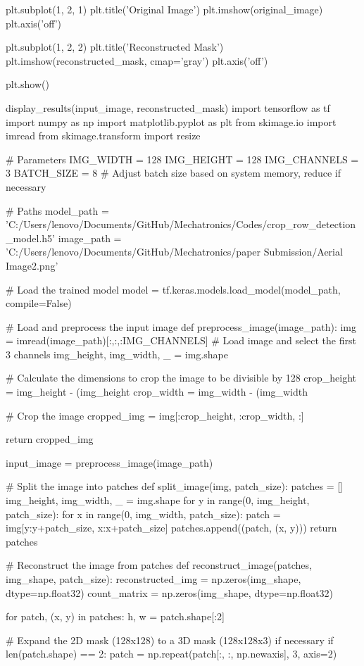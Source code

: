 \documentclass[conference]{IEEEtran}
\begin{document}
plt.subplot(1, 2, 1)
plt.title('Original Image')
plt.imshow(original_image)
plt.axis('off')

plt.subplot(1, 2, 2)
plt.title('Reconstructed Mask')
plt.imshow(reconstructed_mask, cmap='gray')
plt.axis('off')

plt.show()

display_results(input_image, reconstructed_mask)
import tensorflow as tf
import numpy as np
import matplotlib.pyplot as plt
from skimage.io import imread
from skimage.transform import resize

# Parameters
IMG_WIDTH = 128
IMG_HEIGHT = 128
IMG_CHANNELS = 3
BATCH_SIZE = 8  # Adjust batch size based on system memory, reduce if necessary

# Paths
model_path = 'C:/Users/lenovo/Documents/GitHub/Mechatronics/Codes/crop_row_detection_model.h5'
image_path = 'C:/Users/lenovo/Documents/GitHub/Mechatronics/paper Submission/Aerial Image2.png'

# Load the trained model
model = tf.keras.models.load_model(model_path, compile=False)

# Load and preprocess the input image
def preprocess_image(image_path):
img = imread(image_path)[:,:,:IMG_CHANNELS]  # Load image and select the first 3 channels
img_height, img_width, _ = img.shape

# Calculate the dimensions to crop the image to be divisible by 128
crop_height = img_height - (img_height %
crop_width = img_width - (img_width %

# Crop the image
cropped_img = img[:crop_height, :crop_width, :]

return cropped_img

input_image = preprocess_image(image_path)

# Split the image into patches
def split_image(img, patch_size):
patches = []
img_height, img_width, _ = img.shape
for y in range(0, img_height, patch_size):
for x in range(0, img_width, patch_size):
patch = img[y:y+patch_size, x:x+patch_size]
patches.append((patch, (x, y)))
return patches

# Reconstruct the image from patches
def reconstruct_image(patches, img_shape, patch_size):
reconstructed_img = np.zeros(img_shape, dtype=np.float32)
count_matrix = np.zeros(img_shape, dtype=np.float32)

for patch, (x, y) in patches:
h, w = patch.shape[:2]

# Expand the 2D mask (128x128) to a 3D mask (128x128x3) if necessary
if len(patch.shape) == 2:
patch = np.repeat(patch[:, :, np.newaxis], 3, axis=2)
\end{document}
